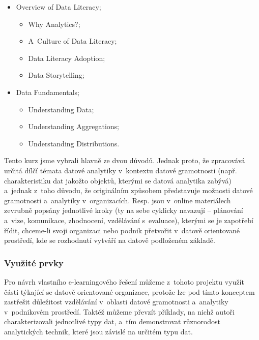 \begin{itemize}
\tightlist
\item
  Overview of Data Literacy;

  \begin{itemize}
  \tightlist
  \item
    Why Analytics?;
  \item
    A~Culture of Data Literacy;
  \item
    Data Literacy Adoption;
  \item
    Data Storytelling;
  \end{itemize}
\item
  Data Fundamentals;

  \begin{itemize}
  \tightlist
  \item
    Understanding Data;
  \item
    Understanding Aggregations;
  \item
    Understanding Distributions.
  \end{itemize}
\end{itemize}

Tento kurz jsme vybrali hlavně ze dvou důvodů. Jednak proto, že zpracovává určitá dílčí témata datové analytiky v~kontextu datové gramotnosti (např. charakteristiku dat jakožto objektů, kterými se datová analytika zabývá) a~jednak z~toho důvodu, že originálním způsobem představuje možnosti datové gramotnosti a~analytiky v~organizacích. Resp. jsou v~online materiálech zevrubně popsány jednotlivé kroky (ty na sebe cyklicky navazují -- plánování a~vize, komunikace, zhodnocení, vzdělávání s~evaluace), kterými se je zapotřebí řídit, chceme-li svoji organizaci nebo podnik přetvořit v~datově orientované prostředí, kde se rozhodnutí vytváří na datově podloženém základě.

\hypertarget{vyuux17eituxe9-prvky-2}{%
\subsubsection{Využité prvky}\label{vyuux17eituxe9-prvky-2}}

Pro návrh vlastního e-learningového řešení můžeme z~tohoto projektu využít části týkající se datově orientované organizace, protože lze pod tímto konceptem zastřešit důležitost vzdělávání v~oblasti datové gramotnosti a~analytiky v~podnikovém prostředí. Taktéž můžeme převzít příklady, na nichž autoři charakterizovali jednotlivé typy dat, a~tím demonstrovat různorodost analytických technik, které jsou závislé na určitém typu dat.

